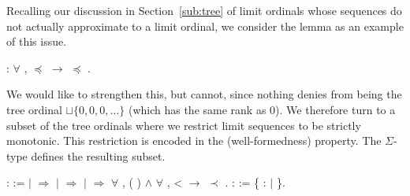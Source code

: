 Recalling our discussion in Section~\ref{sub:tree} of limit ordinals whose
sequences do not actually approximate to a limit ordinal, we consider the
lemma
as an example of this issue.
\begin{singlespace}
\begin{coqdoccode}
\coqdocnoindent
{}
:
\ensuremath{\forall} \coqdocvar{\ensuremath{\alpha}} \coqdocvar{\ensuremath{\beta}},
\coqdocvariable{\ensuremath{\alpha}} \ensuremath{\preceq}
\ensuremath{\rightarrow}
\coqdocvariable{\ensuremath{\alpha}} \ensuremath{\preceq}
\coqdocvariable{\ensuremath{\beta}}.\coqdoceol
\end{coqdoccode}
\end{singlespace}
We would like to strengthen this, but cannot, since nothing denies
\coqdocvariable{$\alpha$} from being the tree ordinal $\sqcup \{ 0, 0, 0,
\ldots \}$ (which has the same rank as $0$). We therefore turn to a subset of
the tree ordinals where we restrict limit sequences to be strictly
monotonic. This restriction is encoded in the
 (well-formedness)
property. The $\Sigma$-type
 defines
the resulting subset.
\begin{singlespace}
\begin{coqdoccode}
\coqdocnoindent
{} 
\coqdocvar{\ensuremath{\alpha}} :  :=\coqdoceol
\coqdocindent{1.00em}
 \coqdocvariable{\ensuremath{\alpha}} \coqdoceol
\coqdocindent{1.00em}
\ensuremath{|} 
\ensuremath{\Rightarrow}
\coqdoceol
\coqdocindent{1.00em}
\ensuremath{|} 
\coqdocvar{\ensuremath{\beta}} \ensuremath{\Rightarrow}
 \coqdocvariable{\ensuremath{\beta}}\coqdoceol
\coqdocindent{1.00em}
\ensuremath{|}  
\ensuremath{\Rightarrow} \ensuremath{\forall} ,
 (
) \ensuremath{\land} \ensuremath{\forall} ,
 <  \ensuremath{\rightarrow}
  \ensuremath{\prec}
 \coqdoceol
\coqdocindent{1.00em}
.\coqdoceol
\coqdocemptyline
\coqdocnoindent
{}
 : 
:=
\{ \coqdocvariable{$\alpha$} :
 \ensuremath{|}
 \coqdocvariable{$\alpha$}
\}.\coqdoceol
\end{coqdoccode}
\end{singlespace}
